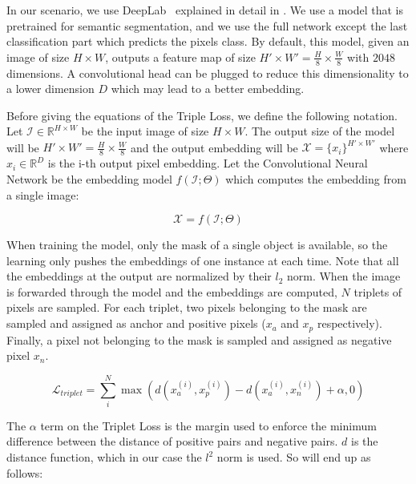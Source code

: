 In our scenario, we use DeepLab~\deeplab{} explained in detail in .
We use a model that is pretrained for semantic segmentation, and we use the full network except the last classification part which predicts the pixels class.
By default, this model, given an image of size $H \times W$, outputs a feature map of size $H' \times W' = \frac{H}{8} \times \frac{W}{8}$ with $2048$ dimensions.
A convolutional head can be plugged to reduce this dimensionality to a lower dimension $D$ which may lead to a better embedding.

Before giving the equations of the Triple Loss, we define the following notation.
Let $\mathcal{I} \in \mathbb{R}^{H \times W}$ be the input image of size $H \times W$.
The output size of the model will be $H' \times W' = \frac{H}{8} \times \frac{W}{8}$ and the output embedding will be $\mathcal{X} = \{x_i\}^{H' \times W'}$ where $x_i \in \mathbb{R}^D$ is the i-th output pixel embedding.
Let the Convolutional Neural Network be the embedding model $f(\mathcal{I}; \Theta)$ which computes the embedding from a single image:

\begin{equation}
  \mathcal{X} = f(\mathcal{I}; \Theta)
\end{equation}

When training the model,
only the mask of a single object is available,
so the learning only pushes the embeddings of one instance at each time.
Note that all the embeddings at the output are normalized by their $l_2$ norm.
When the image is forwarded through the model and the embeddings are computed, $N$ triplets of pixels are sampled.
For each triplet, two pixels belonging to the mask are sampled and assigned as anchor and positive pixels ($x_a$ and $x_p$ respectively).
Finally, a pixel not belonging to the mask is sampled and assigned as negative pixel $x_n$.

\begin{equation}
  \label{eq:tripletloss:1}
  \mathcal{L}_{triplet} = \sum_i^N \max \left( d(x_a^{(i)}, x_p^{(i)}) - d(x_a^{(i)}, x_n^{(i)})  + \alpha, 0 \right)
\end{equation}

The $\alpha$ term on the Triplet Loss is the margin used to enforce the minimum difference between the distance of positive pairs and negative pairs.
$d$ is the distance function, which in our case the $l^2$ norm is used.
So  will end up as follows:

